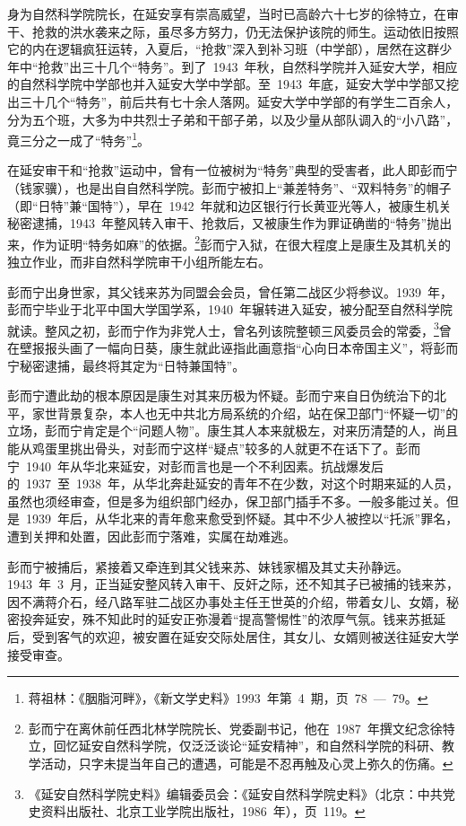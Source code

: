 身为自然科学院院长，在延安享有崇高威望，当时已高龄六十七岁的徐特立，在审干、抢救的洪水袭来之际，虽尽多方努力，仍无法保护该院的师生。运动依旧按照它的内在逻辑疯狂运转，入夏后，“抢救”深入到补习班（中学部），居然在这群少年中“抢救”出三十几个“特务”。到了~1943~年秋，自然科学院并入延安大学，相应的自然科学院中学部也并入延安大学中学部。至~1943~年底，延安大学中学部又挖出三十几个“特务”，前后共有七十余人落网。延安大学中学部的有学生二百余人，分为五个班，大多为中共烈士子弟和干部子弟，以及少量从部队调入的“小八路”，竟三分之一成了“特务”\footnote{蒋祖林：《胭脂河畔》，《新文学史料》1993~年第~4~期，页~78~—~79。}。

在延安审干和“抢救”运动中，曾有一位被树为“特务”典型的受害者，此人即彭而宁（钱家骥），也是出自自然科学院。彭而宁被扣上“兼差特务”、“双料特务”的帽子（即“日特”兼“国特”），早在~1942~年就和边区银行行长黄亚光等人，被康生机关秘密逮捕，1943~年整风转入审干、抢救后，又被康生作为罪证确凿的“特务”抛出来，作为证明“特务如麻”的依据。\footnote{彭而宁在离休前任西北林学院院长、党委副书记，他在~1987~年撰文纪念徐特立，回忆延安自然科学院，仅泛泛谈论“延安精神”，和自然科学院的科研、教学活动，只字未提当年自己的遭遇，可能是不忍再触及心灵上弥久的伤痛。}彭而宁入狱，在很大程度上是康生及其机关的独立作业，而非自然科学院审干小组所能左右。

彭而宁出身世家，其父钱来苏为同盟会会员，曾任第二战区少将参议。1939~年，彭而宁毕业于北平中国大学国学系，1940~年辗转进入延安，被分配至自然科学院就读。整风之初，彭而宁作为非党人士，曾名列该院整顿三风委员会的常委，\footnote{《延安自然科学院史料》编辑委员会：《延安自然科学院史料》（北京：中共党史资料出版社、北京工业学院出版社，1986~年），页~119。}曾在壁报报头画了一幅向日葵，康生就此诬指此画意指“心向日本帝国主义”，将彭而宁秘密逮捕，最终将其定为“日特兼国特”。

彭而宁遭此劫的根本原因是康生对其来历极为怀疑。彭而宁来自日伪统治下的北平，家世背景复杂，本人也无中共北方局系统的介绍，站在保卫部门“怀疑一切”的立场，彭而宁肯定是个“问题人物”。康生其人本来就极左，对来历清楚的人，尚且能从鸡蛋里挑出骨头，对彭而宁这样“疑点”较多的人就更不在话下了。彭而宁~1940~年从华北来延安，对彭而言也是一个不利因素。抗战爆发后的~1937~至~1938~年，从华北奔赴延安的青年不在少数，对这个时期来延的人员，虽然也须经审查，但是多为组织部门经办，保卫部门插手不多。一般多能过关。但是~1939~年后，从华北来的青年愈来愈受到怀疑。其中不少人被控以“托派”罪名，遭到关押和处置，因此彭而宁落难，实属在劫难逃。

彭而宁被捕后，紧接着又牵连到其父钱来苏、妹钱家楣及其丈夫孙静远。1943~年~3~月，正当延安整风转入审干、反奸之际，还不知其子已被捕的钱来苏，因不满蒋介石，经八路军驻二战区办事处主任王世英的介绍，带着女儿、女婿，秘密投奔延安，殊不知此时的延安正弥漫着“提高警惕性”的浓厚气氛。钱来苏抵延后，受到客气的欢迎，被安置在延安交际处居住，其女儿、女婿则被送往延安大学接受审查。

